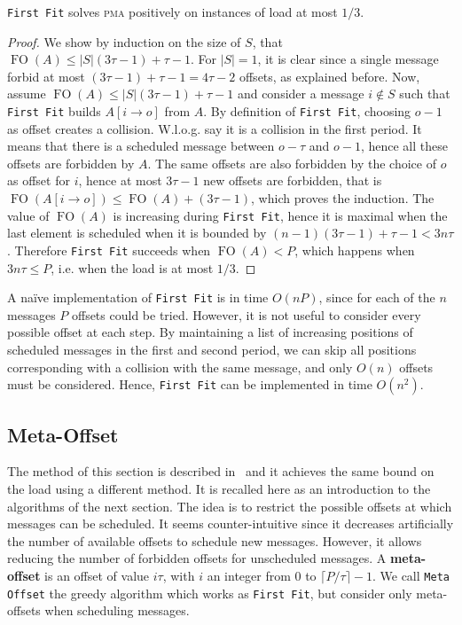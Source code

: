 \documentclass[a4paper,UKenglish,cleveref, autoref, thm-restate]{lipics-v2019}
\DeclareMathOperator{\Fo}{FO}
\newcommand\pma{\textsc{pma}\xspace}
\newcommand\firstfit{\texttt{First Fit}\xspace}
\newcommand\metaoffset{\texttt{Meta Offset}\xspace}
\begin{document}
\begin{theorem}
\firstfit solves \pma positively on instances of load at most $1/3$. 
\end{theorem}
\begin{proof}
We show by induction on the size of $S$, that $\Fo(A) \leq |S|(3\tau -1) + \tau - 1$. For $|S| = 1$, it is clear since a single message forbid at most $(3\tau -1) + \tau -1 = 4\tau-2$ offsets, as explained before. Now, assume $\Fo(A) \leq |S|(3\tau -1) + \tau -1$ and consider a message $i \notin S$ such that \firstfit builds $A[i \rightarrow o]$ from $A$. By definition of \firstfit, choosing $o-1$ as offset creates a collision. W.l.o.g. say it is a collision in the first period. It means that there is a scheduled message between $o - \tau $ and $o-1$, hence all these offsets are forbidden by $A$. The same offsets are also forbidden by the choice of $o$ as offset for $i$, hence at most $3\tau -1$ new offsets are forbidden, that is $\Fo(A[i \rightarrow o]) \leq \Fo(A) + (3\tau -1)$, which proves the induction. 
The value of $\Fo(A)$ is increasing during \firstfit, hence it is maximal when the last element is scheduled when it is bounded by $(n-1)(3\tau -1) + \tau - 1 < 3n\tau$.
Therefore \firstfit succeeds when $\Fo(A) < P$, which happens when $3n\tau \leq P$, i.e. when the load is at most $1/3$.
\end{proof}


A naïve implementation of \firstfit is in time $O(nP)$, since for each of the $n$ messages $P$ offsets could be tried.
However, it is not useful to consider every possible offset at each step. By maintaining a list of increasing positions of scheduled messages in the first and second period, 
we can skip all positions corresponding with a collision with the same message, and only $O(n)$ offsets must be considered. Hence, \firstfit can be implemented in time $O(n^2)$.

\subsection{Meta-Offset}

The method of this section is described in~\cite{bartharxiv2018deterministic} and it achieves the same bound on the load using a different method. It is recalled here as an introduction to the algorithms of the next section.
The idea is to restrict the possible offsets at which messages can be scheduled. It seems counter-intuitive since it decreases artificially the number of available offsets to schedule new messages. However, it allows reducing the number of forbidden offsets for unscheduled messages. A \textbf{meta-offset} is an offset of value $i\tau$,
with $i$ an integer from $0$ to $\lceil P / \tau \rceil - 1$. We call \metaoffset the greedy algorithm which works as \firstfit, but consider only meta-offsets when scheduling messages. 
\end{document}
